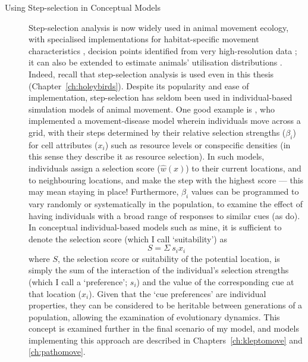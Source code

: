 \begin{tcolorbox}[width=\textwidth,
    boxsep=0pt,
    left=0pt,
    right=0pt,
    top=2pt,
    arc=0pt,
    boxrule=0.0pt,toprule=1pt,
    bottomrule=1pt,
    colback=white
    ]%
    \begin{description}
        \item[Using Step-selection in Conceptual Models] Step-selection analysis is now widely used in animal movement ecology, with specialised implementations for habitat-specific movement characteristics \parencite{avgar2016}, decision points identified from very high-resolution data \parencite{munden2021}; it can also be extended to estimate animals' utilisation distributions \parencite{signer2017}.
        Indeed, recall that step-selection analysis is used even in this thesis (Chapter~\ref{ch:holeybirds}).
        Despite its popularity and ease of implementation, step-selection has seldom been used in individual-based simulation models of animal movement.
        One good example is \textcite{white2018}, who implemented a movement-disease model wherein individuals move across a grid, with their steps determined by their relative selection strengths ($\beta_i$) for cell attributes ($x_i$) such as resource levels or conspecific densities (in this sense they describe it as resource selection).
        In such models, individuals assign a selection score ($\hat{w}(x)$) to their current locations, and to neighbouring locations, and make the step with the highest score --- this may mean staying in place!
        Furthermore, $\beta_i$ values can be programmed to vary randomly or systematically in the population, to examine the effect of having individuals with a broad range of responses to similar cues (as \cite{white2018} do).
        In conceptual individual-based models such as mine, it is sufficient to denote the selection score (which I call `suitability') as
        $$
            S = \Sigma~s_{i}x_{i}
        $$
        where $S$, the selection score or suitability of the potential location, is simply the sum of the interaction of the individual's selection strengths (which I call a `preference'; $s_i$) and the value of the corresponding cue at that location ($x_i$).
        Given that the `cue preferences' are individual properties, they can be considered to be heritable between generations of a population, allowing the examination of evolutionary dynamics.
        This concept is examined further in the final scenario of my model, and models implementing this approach are described in Chapters~\ref{ch:kleptomove} and \ref{ch:pathomove}.
    \end{description}
\end{tcolorbox}

